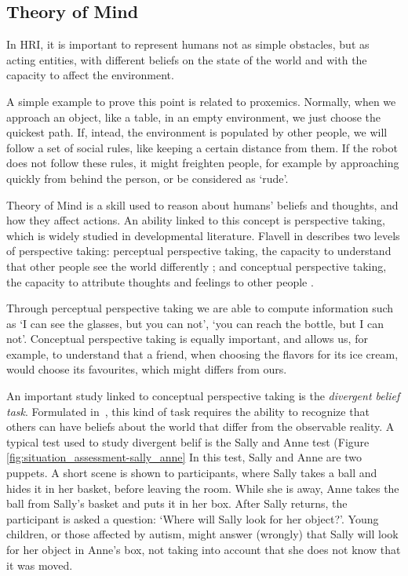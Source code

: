 \subsection{Theory of Mind}
In HRI, it is important to represent humans not as simple obstacles, but as acting entities, with different beliefs on the state of the world and with the capacity to affect the environment. 

A simple example to prove this point is related to proxemics. Normally, when we approach an object, like a table, in an empty environment, we just choose the quickest path. If, intead, the environment is populated by other people, we will follow a set of social rules, like keeping a certain distance from them. If the robot does not follow these rules, it might freighten people, for example by approaching quickly from behind the person, or be considered as `rude'.

Theory of Mind \cite{premack1978does} is a skill used to reason about humans' beliefs and thoughts, and how they affect actions. An ability linked to this concept is perspective taking, which is widely studied in developmental literature.  Flavell in \cite{flavell1977development} describes two levels of perspective taking: 
perceptual perspective taking, the capacity to understand that other people see the world differently \cite{Tversky1999}; and conceptual perspective taking, the capacity to attribute thoughts and feelings to other people \cite{Baron1985}. 

Through perceptual perspective taking we are able to compute information such as `I can see the glasses, but you can not', `you can reach the bottle, but I can not'. Conceptual perspective taking is equally important, and allows us, for example, to understand that a friend, when choosing the flavors for its ice cream, would choose its favourites, which might differs from ours.

An important study linked to conceptual perspective taking is the \textit{divergent belief task}.  Formulated in~\cite{wimmer1983}, this kind of task requires the ability to recognize that others can have beliefs about the world that differ from the observable reality.  A typical test used to study divergent belif is the Sally and Anne test (Figure \ref{fig:situation_assessment-sally_anne} In this test, Sally and Anne are two puppets. A short scene is shown to participants, where Sally takes a ball and hides it in her basket, before leaving the room. While she is away, Anne takes the ball from Sally's basket and puts it in her  box. After Sally returns, the participant is asked a question: `Where will Sally look for her object?'. Young children, or those affected by autism, might answer (wrongly) that Sally will look for her object in Anne's box, not taking into account that she does not know that it was moved.

